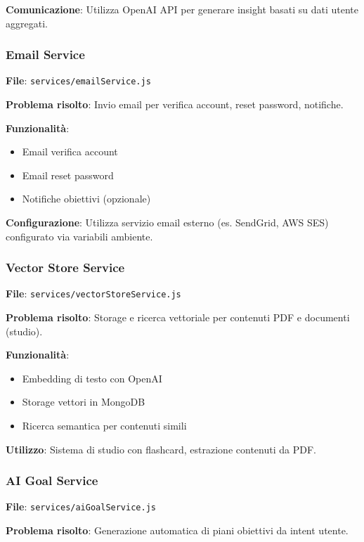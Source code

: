 \documentclass[11pt,a4paper]{article}
\begin{document}
\textbf{Comunicazione}: Utilizza OpenAI API per generare insight basati su dati utente aggregati.

\subsubsection{Email Service}

\textbf{File}: \texttt{services/emailService.js}

\textbf{Problema risolto}: Invio email per verifica account, reset password, notifiche.

\textbf{Funzionalità}:
\begin{itemize}
    \item Email verifica account
    \item Email reset password
    \item Notifiche obiettivi (opzionale)
\end{itemize}

\textbf{Configurazione}: Utilizza servizio email esterno (es. SendGrid, AWS SES) configurato via variabili ambiente.

\subsubsection{Vector Store Service}

\textbf{File}: \texttt{services/vectorStoreService.js}

\textbf{Problema risolto}: Storage e ricerca vettoriale per contenuti PDF e documenti (studio).

\textbf{Funzionalità}:
\begin{itemize}
    \item Embedding di testo con OpenAI
    \item Storage vettori in MongoDB
    \item Ricerca semantica per contenuti simili
\end{itemize}

\textbf{Utilizzo}: Sistema di studio con flashcard, estrazione contenuti da PDF.

\subsubsection{AI Goal Service}

\textbf{File}: \texttt{services/aiGoalService.js}

\textbf{Problema risolto}: Generazione automatica di piani obiettivi da intent utente.
\end{document}
